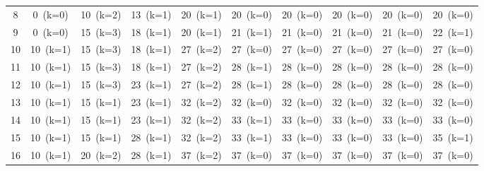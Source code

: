 \documentclass[12pt]{article}
\begin{document}
\begin{landscape}
\begin{longtable}{cccccccccc}
8 & \cellcolor{red!20}0~(k=0) & \cellcolor{green!40}10~(k=2) & \cellcolor{green!40}13~(k=1) & \cellcolor{green!40}20~(k=1) & \cellcolor{yellow!50}20~(k=0) & \cellcolor{red!20}20~(k=0) & \cellcolor{red!20}20~(k=0) & \cellcolor{red!20}20~(k=0) & \cellcolor{red!20}20~(k=0) \\
9 & \cellcolor{red!20}0~(k=0) & \cellcolor{green!40}15~(k=3) & \cellcolor{green!40}18~(k=1) & \cellcolor{green!40}20~(k=1) & \cellcolor{green!40}21~(k=1) & \cellcolor{red!20}21~(k=0) & \cellcolor{red!20}21~(k=0) & \cellcolor{red!20}21~(k=0) & \cellcolor{green!40}22~(k=1) \\
10 & \cellcolor{green!40}10~(k=1) & \cellcolor{green!40}15~(k=3) & \cellcolor{green!40}18~(k=1) & \cellcolor{green!40}27~(k=2) & \cellcolor{red!20}27~(k=0) & \cellcolor{red!20}27~(k=0) & \cellcolor{red!20}27~(k=0) & \cellcolor{red!20}27~(k=0) & \cellcolor{red!20}27~(k=0) \\
11 & \cellcolor{green!40}10~(k=1) & \cellcolor{green!40}15~(k=3) & \cellcolor{green!40}18~(k=1) & \cellcolor{green!40}27~(k=2) & \cellcolor{green!40}28~(k=1) & \cellcolor{red!20}28~(k=0) & \cellcolor{red!20}28~(k=0) & \cellcolor{red!20}28~(k=0) & \cellcolor{red!20}28~(k=0) \\
12 & \cellcolor{green!40}10~(k=1) & \cellcolor{green!40}15~(k=3) & \cellcolor{green!40}23~(k=1) & \cellcolor{green!40}27~(k=2) & \cellcolor{green!40}28~(k=1) & \cellcolor{red!20}28~(k=0) & \cellcolor{red!20}28~(k=0) & \cellcolor{red!20}28~(k=0) & \cellcolor{red!20}28~(k=0) \\
13 & \cellcolor{green!40}10~(k=1) & \cellcolor{yellow!50}15~(k=1) & \cellcolor{green!40}23~(k=1) & \cellcolor{green!40}32~(k=2) & \cellcolor{red!20}32~(k=0) & \cellcolor{red!20}32~(k=0) & \cellcolor{red!20}32~(k=0) & \cellcolor{red!20}32~(k=0) & \cellcolor{red!20}32~(k=0) \\
14 & \cellcolor{green!40}10~(k=1) & \cellcolor{yellow!50}15~(k=1) & \cellcolor{green!40}23~(k=1) & \cellcolor{green!40}32~(k=2) & \cellcolor{green!40}33~(k=1) & \cellcolor{red!20}33~(k=0) & \cellcolor{red!20}33~(k=0) & \cellcolor{red!20}33~(k=0) & \cellcolor{red!20}33~(k=0) \\
15 & \cellcolor{green!40}10~(k=1) & \cellcolor{yellow!50}15~(k=1) & \cellcolor{green!40}28~(k=1) & \cellcolor{green!40}32~(k=2) & \cellcolor{green!40}33~(k=1) & \cellcolor{red!20}33~(k=0) & \cellcolor{red!20}33~(k=0) & \cellcolor{red!20}33~(k=0) & \cellcolor{green!40}35~(k=1) \\
16 & \cellcolor{green!40}10~(k=1) & \cellcolor{green!40}20~(k=2) & \cellcolor{green!40}28~(k=1) & \cellcolor{green!40}37~(k=2) & \cellcolor{red!20}37~(k=0) & \cellcolor{red!20}37~(k=0) & \cellcolor{red!20}37~(k=0) & \cellcolor{red!20}37~(k=0) & \cellcolor{red!20}37~(k=0) \\

\end{longtable}
\end{landscape}
\end{document}
